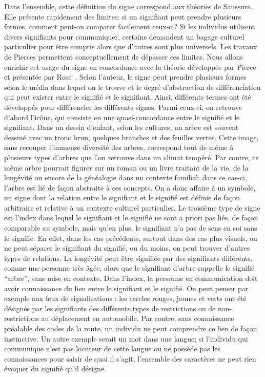 Dans l'ensemble, cette définition du signe correspond aux théories de Saussure.
Elle présente rapidement des limites: si un signifiant peut prendre plusieurs formes, comment peut-on comparer facilement ceux-ci?
Si les individus utilisent divers signifiants pour communiquer, certains demandent un bagage culturel particulier pour être compris alors que d'autres sont plus universels.
Les travaux de Pierces permettent conceptuellement de dépasser ces limites.
Nous allons enrichir cet usage du signe en concordance avec la théorie développée par Pierce et présentée par Rose~\citeyearpar[78]{Rose2001}.
Selon l'auteur, le signe peut prendre plusieurs formes selon le média dans lequel on le trouve et le degré d'abstraction de différenciation qui peut exister entre le signifié et le signifiant.
Ainsi, différents termes ont été développés pour différencier les différents signes.
Parmi ceux-ci, on retrouve d'abord l'icône, qui consiste en une quasi-concordance entre le signifié et le signifiant.
Dans un dessin d'enfant, selon les cultures, un arbre est souvent dessiné avec un tronc brun, quelques branches et des feuilles vertes.
Cette image, sans recouper l'immense diversité des arbres, correspond tout de même à plusieurs types d'arbres que l'on retrouve dans un climat tempéré.
Par contre, ce même arbre pourrait figurer sur un roman ou un livre traitant de la vie, de la longévité ou encore de la généalogie dans un contexte familial: dans ce cas-ci, l'arbre est lié de façon abstraite à ces concepts.
On a donc affaire à un symbole, un signe dont la relation entre le signifiant et le signifié est définie de façon arbitraire et relative à un contexte culturel particulier.
Le troisième type de signe est l'index dans lequel le signifiant et le signifié ne sont a priori pas liés, de façon comparable au symbole, mais qu'en plus, le signifiant n'a pas de sens en soi sans le signifié.
En effet, dans les cas précédents, surtout dans des cas plus visuels, on ne peut séparer le signifiant du signifié, ou du moins, on peut trouver d'autres types de relations.
La longévité peut être signifiée par des signifiants différents, comme une personne très âgée, alors que le signifiant d'arbre rappelle le signifié \enquote{arbre}, sans mise en contexte.
Dans l'index, la personne en communication doit avoir connaissance du lien entre le signifiant et le signifié.
On peut penser par exemple aux feux de signalisations : les cercles rouges, jaunes et verts ont été désignés par les signifiants des différents types de restrictions ou de non-restrictions au déplacement en automobile.
Par contre, sans connaissance préalable des codes de la route, un individu ne peut comprendre ce lien de façon instinctive.
Un autre exemple serait un mot dans une langue; si l'individu qui communique n'est pas locuteur de cette langue ou ne possède pas les connaissances pour saisir de quoi il s'agit, l'ensemble des caractères ne peut rien évoquer du signifié qu'il désigne.

